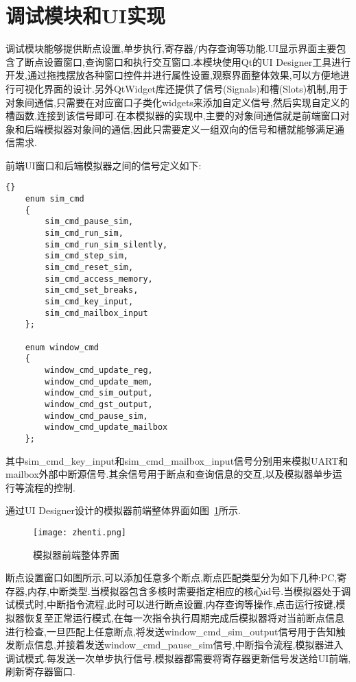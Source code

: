 

\section{调试模块和UI实现}
调试模块能够提供断点设置,单步执行,寄存器/内存查询等功能.UI显示界面主要包含了断点设置窗口,查询窗口和执行交互窗口.本模块使用Qt的UI Designer工具进行开发,通过拖拽摆放各种窗口控件并进行属性设置,观察界面整体效果,可以方便地进行可视化界面的设计.另外QtWidget库还提供了信号(Signals)和槽(Slots)机制,用于对象间通信,只需要在对应窗口子类化widgets来添加自定义信号,然后实现自定义的槽函数,连接到该信号即可.在本模拟器的实现中,主要的对象间通信就是前端窗口对象和后端模拟器对象间的通信,因此只需要定义一组双向的信号和槽就能够满足通信需求.


前端UI窗口和后端模拟器之间的信号定义如下:
\begin{lstlisting}{}
    enum sim_cmd
    {
        sim_cmd_pause_sim,
        sim_cmd_run_sim,
        sim_cmd_run_sim_silently,
        sim_cmd_step_sim,
        sim_cmd_reset_sim,
        sim_cmd_access_memory,
        sim_cmd_set_breaks,
        sim_cmd_key_input,
        sim_cmd_mailbox_input
    };
        
    enum window_cmd
    {
        window_cmd_update_reg,
        window_cmd_update_mem,
        window_cmd_sim_output,
        window_cmd_gst_output,
        window_cmd_pause_sim,
        window_cmd_update_mailbox
    };          
\end{lstlisting}
其中sim\_cmd\_key\_input和sim\_cmd\_mailbox\_input信号分别用来模拟UART和mailbox外部中断源信号.其余信号用于断点和查询信息的交互,以及模拟器单步运行等流程的控制.
        
        
通过UI Designer设计的模拟器前端整体界面如图~\ref{fig:zhenti}所示.
\begin{figure}[h]
    \centering
    \texttt{[image: zhenti.png]}
    \caption{模拟器前端整体界面}
    \label{fig:zhenti}
\end{figure}


断点设置窗口如图所示,可以添加任意多个断点,断点匹配类型分为如下几种:PC,寄存器,内存,中断类型.当模拟器包含多核时需要指定相应的核心id号.当模拟器处于调试模式时,中断指令流程,此时可以进行断点设置,内存查询等操作,点击运行按键,模拟器恢复至正常运行模式,在每一次指令执行周期完成后模拟器将对当前断点信息进行检查,一旦匹配上任意断点,将发送window\_cmd\_sim\_output信号用于告知触发断点信息,并接着发送window\_cmd\_pause\_sim信号,中断指令流程,模拟器进入调试模式.每发送一次单步执行信号,模拟器都需要将寄存器更新信号发送给UI前端,刷新寄存器窗口.


